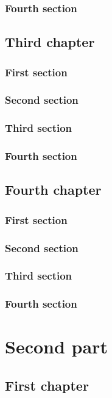 \documentclass{researchbook}
\begin{document}
\section{Fourth section}\lipsum


\chapter{Third chapter}

\section{First section}\lipsum
\section{Second section}\lipsum
\section{Third section}\lipsum
\section{Fourth section}\lipsum


\chapter{Fourth chapter}

\section{First section}\lipsum
\section{Second section}\lipsum
\section{Third section}\lipsum
\section{Fourth section}\lipsum


\part{Second part}
\chapter{First chapter}
\end{document}
